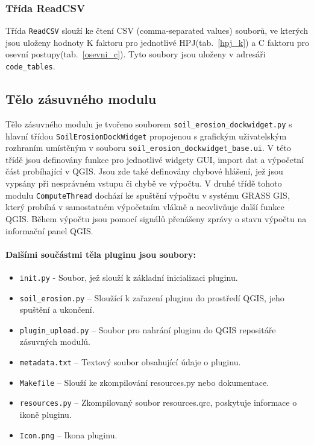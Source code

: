 \subsubsection{Třída ReadCSV} Třída \texttt{ReadCSV} slouží ke čtení
CSV (comma-separated values) souborů, ve kterých jsou uloženy hodnoty
K faktoru pro jednotlivé HPJ(tab.~\ref{hpj_k}) a C faktoru pro osevní postupy(tab.~\ref{osevni_c}). Tyto
soubory jsou uloženy v adresáři \texttt{code\_tables}.

\subsection{Tělo zásuvného modulu} Tělo zásuvného modulu je tvořeno
souborem \texttt{soil\_erosion\_dockwidget.py} s hlavní třídou
\texttt{SoilErosionDockWidget} propojenou s grafickým uživatelským
rozhraním umístěným v souboru
\texttt{soil\_erosion\_dockwidget\_base.ui}. V této třídě jsou
definovány funkce pro jednotlivé widgety GUI, import dat a výpočetní
část probíhající v QGIS. Jsou zde také definovány chybové hlášení, jež
jsou vypsány při nesprávném vstupu či chybě ve výpočtu. V druhé třídě
tohoto modulu \texttt{ComputeThread} dochází ke spuštění výpočtu v
systému GRASS GIS, který probíhá v samostatném výpočetním vlákně a
neovlivňuje další funkce QGIS. Během výpočtu jsou pomocí signálů
přenášeny zprávy o stavu výpočtu na informační panel QGIS.

\paragraph{Dalšími součástmi těla pluginu jsou soubory:}
\begin{itemize}
	\item \texttt{init.py} - Soubor, jež slouží k základní inicializaci
pluginu.
	\item \texttt{soil\_erosion.py} – Sloužící k zařazení pluginu
do prostředí QGIS, jeho spuštění a ukončení.
	\item \texttt{plugin\_upload.py} – Soubor pro nahrání pluginu
do QGIS repositáře zásuvných modulů.
	\item \texttt{metadata.txt} – Textový soubor obsahující údaje
o pluginu.
	\item \texttt{Makefile} – Slouží ke zkompilování resources.py
nebo dokumentace.
	\item \texttt{resources.py} – Zkompilovaný soubor
resources.qrc, poskytuje informace o ikoně pluginu.
	\item \texttt{Icon.png} – Ikona pluginu.
\end{itemize}
\newpage
